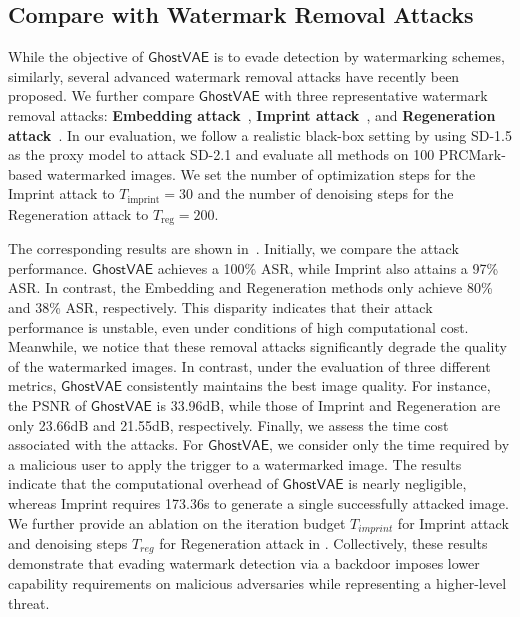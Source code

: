 \documentclass[letterpaper,twocolumn,10pt]{article}
\newcommand{\mg}{$\mathsf{GhostVAE}$\xspace}
\newcommand{\mypara}[1]{\smallskip\noindent{\bf {#1}.} \xspace}
\begin{document}
\subsection{Compare with Watermark Removal Attacks}
\label{sec:55dis_removal}
\mypara{Baseline Attacks}
While the objective of \mg is to evade detection by watermarking schemes, similarly, several advanced watermark removal attacks have recently been proposed. 
We further compare \mg with three representative watermark removal attacks: \textbf{Embedding attack}~\cite{DBLP:conf/icml/AnDRAXDZMWGH24}, \textbf{Imprint attack}~\cite{DBLP:conf/cvpr/0025LTFQ25}, and \textbf{Regeneration attack}~\cite{DBLP:conf/nips/ZhaoZSVGKVWL24}.
In our evaluation, we follow a realistic black-box setting by using SD-1.5 as the proxy model to attack SD-2.1 and evaluate all methods on 100 PRCMark-based watermarked images.
We set the number of optimization steps for the Imprint attack to $T_{\text{imprint}}=30$ and the number of denoising steps for the Regeneration attack to $T_{\text{reg}}=200$.

\mypara{Evaluation Results}
The corresponding results are shown in~.
Initially, we compare the attack performance. \mg achieves a 100\% ASR, while Imprint also attains a 97\% ASR. 
In contrast, the Embedding and Regeneration methods only achieve 80\% and 38\% ASR, respectively. 
This disparity indicates that their attack performance is unstable, even under conditions of high computational cost.
Meanwhile, we notice that these removal attacks significantly degrade the quality of the watermarked images. 
In contrast, under the evaluation of three different metrics, \mg consistently maintains the best image quality. 
For instance, the PSNR of \mg is 33.96dB, while those of Imprint and Regeneration are only 23.66dB and 21.55dB, respectively.
Finally, we assess the time cost associated with the attacks. 
For \mg, we consider only the time required by a malicious user to apply the trigger to a watermarked image. 
The results indicate that the computational overhead of \mg is nearly negligible, whereas Imprint requires 173.36s to generate a single successfully attacked image.
We further provide an ablation on the iteration budget $T_{imprint}
$ for Imprint attack and denoising steps $T_{reg}$ for Regeneration attack in .
Collectively, these results demonstrate that evading watermark detection via a backdoor imposes lower capability requirements on malicious adversaries while representing a higher-level threat.
\end{document}

